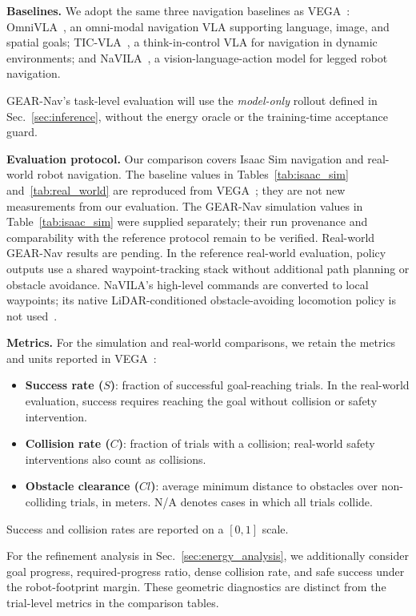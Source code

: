\documentclass[letterpaper, 10 pt, conference]{ieeeconf}  %
\begin{document}
\textbf{Baselines.}
We adopt the same three navigation baselines as VEGA~\cite{vega}:
OmniVLA~\cite{omnivla}, an omni-modal navigation VLA supporting language,
image, and spatial goals; TIC-VLA~\cite{ticvla}, a think-in-control VLA for
navigation in dynamic environments; and NaVILA~\cite{navila}, a
vision-language-action model for legged robot navigation.

GEAR-Nav's task-level evaluation will use the \emph{model-only} rollout
defined in Sec.~\ref{sec:inference}, without the energy oracle or the
training-time acceptance guard.

\textbf{Evaluation protocol.}
Our comparison covers Isaac Sim navigation and real-world robot navigation.
The baseline values in Tables~\ref{tab:isaac_sim} and~\ref{tab:real_world}
are reproduced from VEGA~\cite{vega}; they are not new measurements from
our evaluation. The GEAR-Nav simulation values in Table~\ref{tab:isaac_sim}
were supplied separately; their run provenance and comparability with the
reference protocol remain to be verified. Real-world GEAR-Nav results are
pending. In the reference real-world evaluation,
policy outputs use a shared waypoint-tracking stack without additional path
planning or obstacle avoidance. NaVILA's high-level commands are converted
to local waypoints; its native LiDAR-conditioned obstacle-avoiding locomotion
policy is not used~\cite{vega}.

\textbf{Metrics.}
For the simulation and real-world comparisons, we retain the metrics and
units reported in VEGA~\cite{vega}:
\begin{itemize}
    \item \textbf{Success rate ($S$)}: fraction of successful goal-reaching
    trials. In the real-world evaluation, success requires reaching the goal
    without collision or safety intervention.
    \item \textbf{Collision rate ($C$)}: fraction of trials with a collision;
    real-world safety interventions also count as collisions.
    \item \textbf{Obstacle clearance ($Cl$)}: average minimum distance to
    obstacles over non-colliding trials, in meters. N/A denotes cases in
    which all trials collide.
\end{itemize}
Success and collision rates are reported on a $[0,1]$ scale.

For the refinement analysis in Sec.~\ref{sec:energy_analysis}, we additionally
consider goal progress, required-progress ratio, dense collision rate, and
safe success under the robot-footprint margin. These geometric diagnostics
are distinct from the trial-level metrics in the comparison tables.
\end{document}
